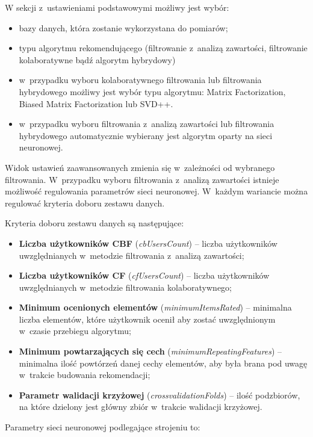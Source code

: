 \documentclass[twoside]{iisthesis}
\begin{document}
		W sekcji z~ustawieniami podstawowymi możliwy jest wybór:
		\begin{itemize}
			\item bazy danych, która zostanie wykorzystana do pomiarów;
			\item typu algorytmu rekomendującego (filtrowanie z~analizą zawartości, filtrowanie kolaboratywne bądź algorytm hybrydowy)
			\item w~przypadku wyboru kolaboratywnego filtrowania lub filtrowania hybrydowego możliwy jest wybór typu algorytmu: Matrix Factorization, Biased Matrix Factorization lub SVD++.
			\item w~przypadku wyboru filtrowania z~analizą zawartości lub filtrowania hybrydowego automatycznie wybierany jest algorytm oparty na sieci neuronowej. 
		\end{itemize}
		 
		 Widok ustawień zaawansowanych zmienia się w~zależności od wybranego filtrowania. W~przypadku wyboru filtrowania z~analizą zawartości istnieje możliwość regulowania parametrów sieci neuronowej. W~każdym wariancie można regulować kryteria doboru zestawu danych.
		 
		 Kryteria doboru zestawu danych są następujące:
		 
		 \begin{itemize}
		 	\item \textbf{Liczba użytkowników CBF} (\textit{cbUsersCount}) -- liczba użytkowników uwzględnianych w~metodzie filtrowania z~analizą zawartości;
		 	\item \textbf{Liczba użytkowników CF} (\textit{cfUsersCount}) -- liczba użytkowników uwzględnianych w~metodzie filtrowania kolaboratywnego;
		 	\item \textbf{Minimum ocenionych elementów} (\textit{minimumItemsRated}) -- minimalna liczba elementów, które użytkownik ocenił aby zostać uwzględnionym w~czasie przebiegu algorytmu;
		 	\item \textbf{Minimum powtarzających się cech} (\textit{minimumRepeatingFeatures}) -- minimalna ilość powtórzeń danej cechy elementów, aby była brana pod uwagę w~trakcie budowania rekomendacji;
		 	\item \textbf{Parametr walidacji krzyżowej} (\textit{crossvalidationFolds}) -- ilość podzbiorów, na które dzielony jest główny zbiór w~trakcie walidacji krzyżowej. 
		 \end{itemize}
		 
		 Parametry sieci neuronowej podlegające strojeniu to:
\end{document}
